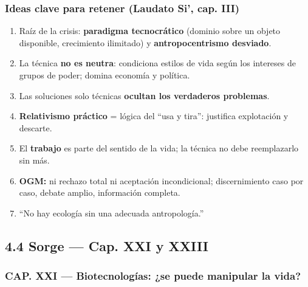 \documentclass[10pt,a4paper]{article}
\begin{document}
\subsubsection{Ideas clave para retener (Laudato Si', cap. III)}
\begin{enumerate}
\item Raíz de la crisis: \textbf{paradigma tecnocrático} (dominio sobre un objeto disponible, crecimiento ilimitado) y \textbf{antropocentrismo desviado}.
\item La técnica \textbf{no es neutra}: condiciona estilos de vida según los intereses de grupos de poder; domina economía y política.
\item Las soluciones solo técnicas \textbf{ocultan los verdaderos problemas}.
\item \textbf{Relativismo práctico} = lógica del ``usa y tira'': justifica explotación y descarte.
\item El \textbf{trabajo} es parte del sentido de la vida; la técnica no debe reemplazarlo sin más.
\item \textbf{OGM:} ni rechazo total ni aceptación incondicional; discernimiento caso por caso, debate amplio, información completa.
\item ``No hay ecología sin una adecuada antropología.''
\end{enumerate}



\subsection{4.4 Sorge --- Cap. XXI y XXIII}

\subsubsection{CAP. XXI --- Biotecnologías: ¿se puede manipular la vida?}
\end{document}
